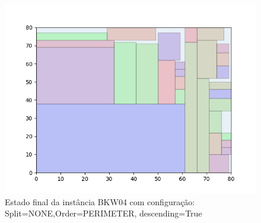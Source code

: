 \begin{figure}[H]
    \centering
    \caption[]{Estado final da instância BKW04 com configuração: Split=NONE,Order=PERIMETER, descending=True}
    \label{fig:bkw04-none-perimeter-true}
    \includegraphics[scale=0.5]{output/figures/bkw/bkw04/none/perimeter/true/00}
\end{figure}
